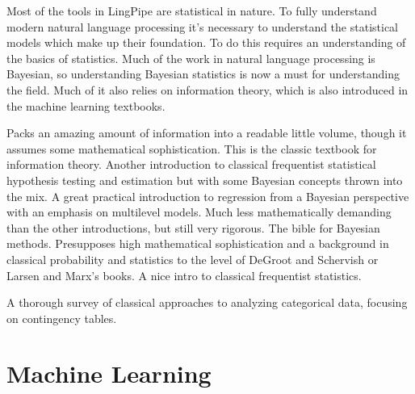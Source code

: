 \noindent
Most of the tools in LingPipe are statistical in nature.  To fully
understand modern natural language processing it's necessary to
understand the statistical models which make up their foundation.
To do this requires an understanding of the basics of statistics.
Much of the work in natural language processing is Bayesian, so
understanding Bayesian statistics is now a must for understanding
the field.  Much of it also relies on information theory, which is
also introduced in the machine learning textbooks.

\begin{itemize}
%
{Packs an amazing amount of information into
a readable little volume, though it assumes some mathematical
sophistication.}
%
{This is the classic textbook for information theory.}
%
{Another introduction to classical frequentist
statistical hypothesis testing and estimation but with some Bayesian
concepts thrown into the mix.}
%
{A great practical introduction to regression from a Bayesian
perspective with an emphasis on multilevel models.  Much less mathematically
demanding than the other introductions, but still very rigorous.}
%
{The bible for Bayesian methods.  Presupposes high
mathematical sophistication and a background in classical probability
and statistics to the level of DeGroot and Schervish or Larsen
and Marx's books.}
%
{A nice intro to classical frequentist statistics.}
%

{A thorough survey of classical approaches to analyzing categorical data,
focusing on contingency tables.}

\end{itemize}


\section{Machine Learning}


